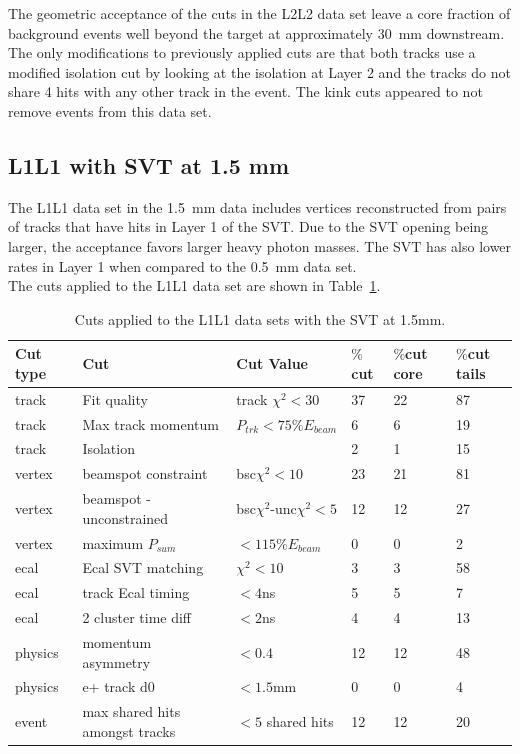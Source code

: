 The geometric acceptance of the cuts in the L2L2 data set leave a core fraction of background events well beyond the target at approximately 30~mm downstream. The only modifications to previously applied cuts are that both tracks use a modified isolation cut by looking at the isolation at Layer 2 and the tracks do not share 4 hits with any other track in the event.  The kink cuts appeared to not remove events from this data set.

\subsection{L1L1 with SVT at 1.5 mm}
The L1L1 data set in the 1.5~mm data includes vertices reconstructed from pairs of tracks that have hits in Layer 1 of the SVT. Due to the SVT opening being larger, the acceptance favors larger heavy photon masses. The SVT has also lower rates in Layer 1 when compared to the 0.5~mm data set.\\
\indent The cuts applied to the L1L1 data set are shown in Table~\ref{l1l1_cuts_1p5}.

\begin{table}[H]
\caption{Cuts applied to the L1L1 data sets with the SVT at 1.5mm.}
\label{l1l1_cuts_1p5}
\centering
\begin{tabular}{llllll}
\toprule
Cut type & Cut & Cut Value &  $\%$cut &  $\%$cut core & $\%$cut tails\\
\midrule
track & Fit quality & track $\chi^{2}<30$ & 37 & 22 & 87 \\
track & Max track momentum &  $P_{trk}<75\%E_{beam}$ & 6 & 6 & 19 \\
track & Isolation &   & 2 & 1 & 15 \\
vertex & beamspot constraint & bsc$\chi^{2}<10$  & 23 & 21 & 81 \\
vertex & beamspot - unconstrained & bsc$\chi^{2}$-unc$\chi^2<5$  & 12 & 12 & 27 \\
vertex & maximum $P_{sum}$ &  $<115\%E_{beam}$ & 0 & 0 & 2 \\
ecal & Ecal SVT matching & $\chi^2<10$  & 3 & 3 & 58 \\
ecal & track Ecal timing & $<4$ns  & 5 & 5 & 7 \\
ecal & 2 cluster time diff & $<2$ns  & 4 & 4 & 13 \\
physics & momentum asymmetry & $<0.4$  & 12 & 12 & 48 \\
physics & e+ track d0 & $<1.5$mm  & 0 & 0 & 4 \\
event & max shared hits amongst tracks & $<5$ shared hits  & 12 & 12 & 20 \\
\bottomrule
\end{tabular}
\end{table}

